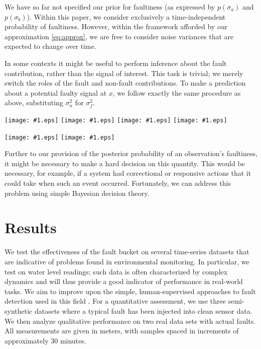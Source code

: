 \documentclass{article}
\newcommand{\psff}[1]{\texttt{[image: \#1.eps]}}
\begin{document}
We have so far not specified our prior for faultiness (as expressed by
$p(\sigma_a)$ and $p(\sigma_b)$). Within this paper, we consider
exclusively a time-independent probability of faultiness. However,
within the framework afforded by our approximation \eqref{eq:approx},
we are free to consider noise variances that are expected to change
over time.

In some contexts it might be useful to perform inference about the
fault contribution, rather than the signal of interest.  This task is
trivial; we merely switch the roles of the fault and non-fault
contributions.  To make a prediction about a potential faulty signal
at $x$, we follow exactly the same procedure as above, substituting
$\sigma_n^2$ for $\sigma_f^2$.

\begin{figure*}
  \centering
  \psff{bias}
  \psff{kf_bias}
  \psff{dynamics}
  \psff{kf_dynamics}
  \label{test}
\end{figure*}

\begin{figure*}
  \centering
  \psff{painting}
  \psff{fishkiller}
  \label{test}
\end{figure*}

Further to our provision of the posterior probability of an
observation's faultiness, it might be necessary to make a hard
decision on this quantity. This would be necessary, for example, if a
system had correctional or responsive actions that it could take when
such an event occurred.  Fortunately, we can address this problem
using simple Bayesian decision theory.

\section{Results}
We test the effectiveness of the fault bucket on several time-series
datasets that are indicative of problems found in environmental
monitoring. In particular, we test on water level readings; such data
is often characterized by complex dynamics and will thus provide a
good indicator of performance in real-world tasks. We aim to improve
upon the simple, human-supervised approaches to fault detection used
in this field \citep{wagner2006guidelines}. For a quantitative
assessment, we use three semi-synthetic datasets where a typical fault
has been injected into clean sensor data. We then analyze qualitative
performance on two real data sets with actual faults. All measurements
are given in meters, with samples spaced in increments of
approximately 30 minutes.
\end{document}
